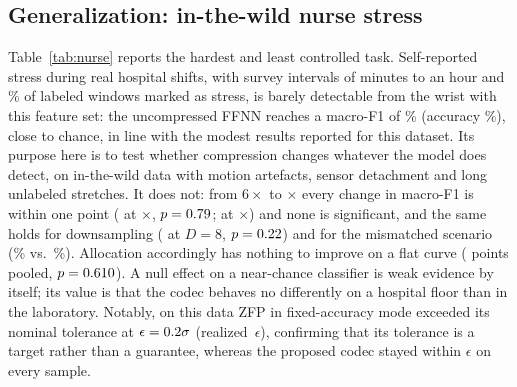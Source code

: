 \documentclass[journal,twoside,web]{ieeecolor}
\begin{document}
\subsection{Generalization: in-the-wild nurse stress}
\begin{table}[t]
\caption{Nurse stress (in the wild): self-reported stress vs.\ none, LOSO over \nurseNSubjects{} nurses, \nSeeds{} seeds. F1 is macro-F1; ``F1 mism.''\ is an uncompressed-trained model on reconstructed data.}
\label{tab:nurse}
\centering\scriptsize
\resizebox{\columnwidth}{!}{}
\end{table}
Table~\ref{tab:nurse} reports the hardest and least controlled task. Self-reported stress during real hospital shifts, with survey intervals of minutes to an hour and \nursePctStress\% of labeled windows marked as stress, is barely detectable from the wrist with this feature set: the uncompressed FFNN reaches a macro-F1 of \nurseRawF\% (accuracy \nurseRawAcc\%), close to chance, in line with the modest results reported for this dataset. Its purpose here is to test whether compression changes whatever the model does detect, on in-the-wild data with motion artefacts, sensor detachment and long unlabeled stretches. It does not: from $6\times$ to \nurseRatioEf$\times$ every change in macro-F1 is within one point (\nurseDFEd{} at \nurseRatioEd$\times$, $p=0.79$; \nurseDFEf{} at \nurseRatioEf$\times$) and none is significant, and the same holds for downsampling (\nurseDsDFH{} at $D=8$, $p=0.22$) and for the mismatched scenario (\nurseFMMEd\% vs.\ \nurseDsFMMH\%). Allocation accordingly has nothing to improve on a flat curve (\nurseallocPooledDiff{} points pooled, $p=0.610$). A null effect on a near-chance classifier is weak evidence by itself; its value is that the codec behaves no differently on a hospital floor than in the laboratory. Notably, on this data ZFP in fixed-accuracy mode exceeded its nominal tolerance at $\epsilon=0.2\sigma$ (realized \nurseZfpErrMax\,$\epsilon$), confirming that its tolerance is a target rather than a guarantee, whereas the proposed codec stayed within $\epsilon$ on every sample.
\end{document}
